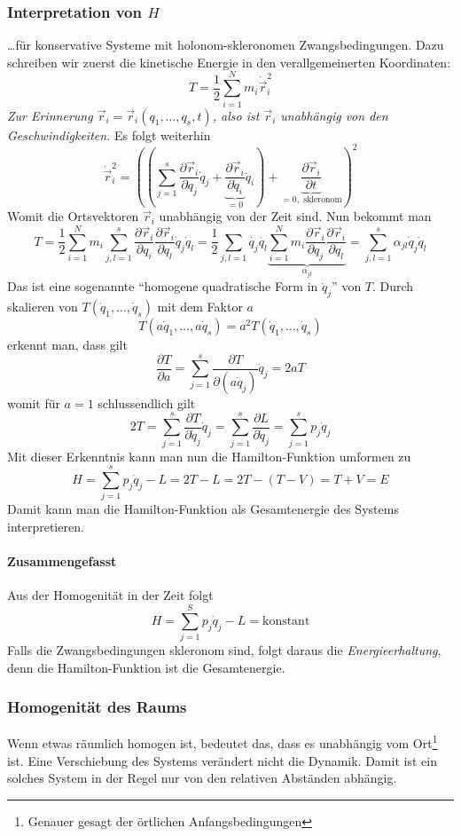 \documentclass[oneside]{book}
\theoremstyle{definition}
\newcommand{\ffpartial}[2]{\frac{\partial #1}{\partial #2}}
\newcommand{\dotvec}[1]{\dot{\vec{#1}}}
\newcommand{\const}{\text{konstant}}
\begin{document}
\subsubsection{Interpretation von $H$} \dots für konservative Systeme mit holonom-skleronomen Zwangsbedingungen.
Dazu schreiben wir zuerst die kinetische Energie in den verallgemeinerten Koordinaten:
$$T = \frac12 \sum_{i=1}^N m_i \dotvec{r}_i^2$$
\textit{Zur Erinnerung $\vec{r}_i = \vec{r}_i(q_1, \dots, q_s, t)$, also ist $\vec{r}_i$ unabhängig von den Geschwindigkeiten.} Es folgt weiterhin
$$\dotvec{r}_i^2 = \left( (\sum_{j=1}^s \ffpartial{\vec{r}_i}{q_j} \dot{q}_j + \underbrace{\ffpartial{\vec{r}_i}{\dot{q}_i}}_{=0} \ddot{q}_i) + \underbrace{\ffpartial{\vec{r}_i}{t}}_{=0, \text{ skleronom}}\right)^2 $$
Womit die Ortsvektoren $\vec{r}_i$ unabhängig von der Zeit sind. Nun bekommt man
$$T = \frac12 \sum_{i=1}^N m_i \sum_{j,l=1}^{s} \ffpartial{\vec{r}_i}{q_i} \ffpartial{\vec{r}_i}{q_l} \dot{q}_j \dot{q}_l = \frac12 \sum_{j,l = 1}^{} \dot{q_j} \dot{q_l} \underbrace{\sum_{i=1}^N m_i \ffpartial{\vec{r}_i}{q_j} \ffpartial{\vec{r}_i}{q_l}}_{\alpha_{jl}} = \sum_{j,l=1}^s \alpha_{jl} \dot{q}_j \dot{q}_l$$
Das ist eine sogenannte "`homogene quadratische Form in $\dot{q}_j$"' von $T$.
Durch skalieren von $T(\dot{q}_1, \dots, \dot{q}_s)$ mit dem Faktor $a$
$$T(a \dot{q}_1, \dots, a \dot{q}_s) = a^2 T(\dot{q}_1, \dots, \dot{q}_s)$$
erkennt man, dass gilt
$$\ffpartial{T}{a} = \sum_{j=1}^s \ffpartial{T}{(a \dot{q}_j)}\dot{q}_j = 2 a T$$
womit für $a = 1$ schlussendlich  gilt
$$ 2 T = \sum_{j=1}^s \ffpartial{T}{\dot{q}_j} \dot{q}_j = \sum_{j=1}^s \ffpartial{L}{\dot{q}_j} = \sum_{j=1}^s p_j \dot{q}_j$$
Mit dieser Erkenntnis kann man nun die Hamilton-Funktion umformen zu
$$H = \sum_{j=1}^s p_j \dot{q}_j - L = 2T - L = 2 T - (T-V) = T + V = E$$
Damit kann man die Hamilton-Funktion als Gesamtenergie des Systems interpretieren.






\paragraph{Zusammengefasst}
Aus der Homogenität in der Zeit folgt
\[H=\sum\limits_{j=1}^S p_j\dot q_j - L = \const\]
Falls die Zwangsbedingungen skleronom sind, folgt daraus die \emph{Energieerhaltung}, denn die Hamilton-Funktion ist die Gesamtenergie.

\subsubsection{Homogenität des Raums}
Wenn etwas räumlich homogen ist, bedeutet das, dass es unabhängig vom Ort\footnote{Genauer gesagt der örtlichen Anfangsbedingungen} ist. Eine Verschiebung des Systems verändert nicht die Dynamik. Damit ist ein solches System in der Regel nur von den relativen Abständen abhängig.
\end{document}
